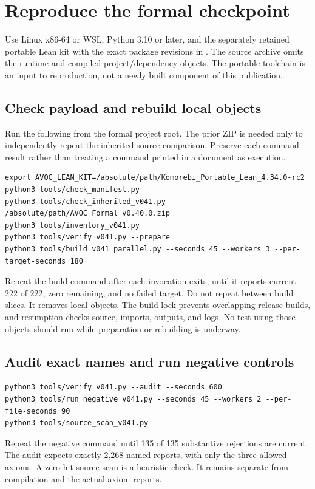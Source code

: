 \documentclass[11pt]{article}
\begin{document}
\section{Reproduce the formal checkpoint}
\label{sec:reproduce}
Use Linux x86-64 or WSL, Python 3.10 or later, and the separately retained
portable Lean kit with the exact package revisions in .
The source archive omits the runtime and compiled project/dependency objects.
The portable toolchain is an input to reproduction, not a newly built component
of this publication.

\subsection{Check payload and rebuild local objects}
Run the following from the formal project root. The prior ZIP is needed only
to independently repeat the inherited-source comparison. Preserve each command
result rather than treating a command printed in a document as execution.

\begin{lstlisting}[style=LeanCode]
export AVOC_LEAN_KIT=/absolute/path/Komorebi_Portable_Lean_4.34.0-rc2
python3 tools/check_manifest.py
python3 tools/check_inherited_v041.py /absolute/path/AVOC_Formal_v0.40.0.zip
python3 tools/inventory_v041.py
python3 tools/verify_v041.py --prepare
python3 tools/build_v041_parallel.py --seconds 45 --workers 3 --per-target-seconds 180
\end{lstlisting}

Repeat the build command after each invocation exits, until it reports current
222 of 222, zero remaining, and no failed target. Do not repeat
 between build slices. It removes local objects. The build lock
prevents overlapping release builds, and resumption checks source, imports,
outputs, and logs. No test using those objects should run while preparation or
rebuilding is underway.

\subsection{Audit exact names and run negative controls}
\begin{lstlisting}[style=LeanCode]
python3 tools/verify_v041.py --audit --seconds 600
python3 tools/run_negative_v041.py --seconds 45 --workers 2 --per-file-seconds 90
python3 tools/source_scan_v041.py
\end{lstlisting}
Repeat the negative command until 135 of 135 substantive rejections are
current. The audit expects exactly 2,268 named reports, with only the three
allowed axioms. A zero-hit source scan is a heuristic check. It remains
separate from compilation and the actual axiom reports.
\end{document}
